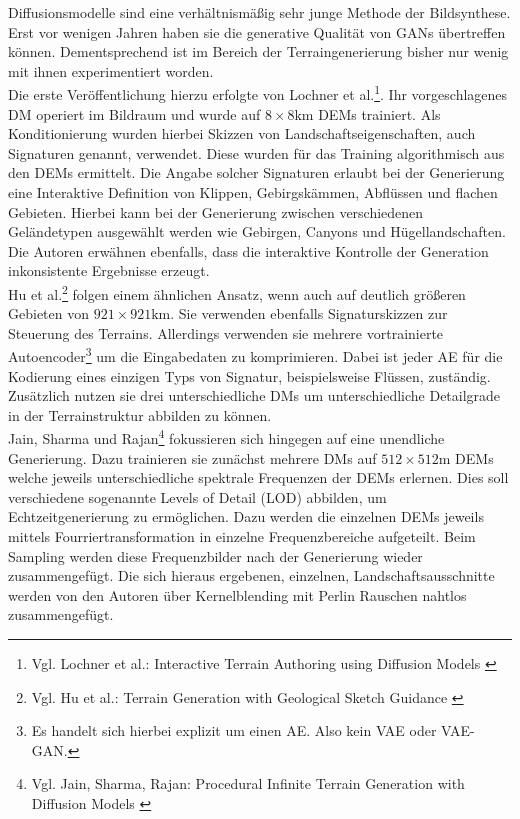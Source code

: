 Diffusionsmodelle sind eine verhältnismäßig sehr junge Methode der Bildsynthese. Erst vor wenigen Jahren haben sie die generative Qualität von \ac{GAN}s übertreffen können. Dementsprechend ist im Bereich der Terraingenerierung bisher nur wenig mit ihnen experimentiert worden. \\
Die erste Veröffentlichung hierzu erfolgte von Lochner et al.\footnote{
    Vgl. Lochner et al.: Interactive Terrain Authoring using Diffusion Models
    \cite{lochner2023interactive}
}. Ihr vorgeschlagenes \ac{DM} operiert im Bildraum und wurde auf $8\times8\text{km}$ \ac{DEM}s trainiert. Als Konditionierung wurden hierbei Skizzen von Landschaftseigenschaften, auch Signaturen genannt, verwendet. Diese wurden für das Training algorithmisch aus den \ac{DEM}s ermittelt. Die Angabe solcher Signaturen erlaubt bei der Generierung eine Interaktive Definition von Klippen, Gebirgskämmen, Abflüssen und flachen Gebieten. Hierbei kann bei der Generierung zwischen verschiedenen Geländetypen ausgewählt werden wie Gebirgen, Canyons und Hügellandschaften. Die Autoren erwähnen ebenfalls, dass die interaktive Kontrolle der Generation inkonsistente Ergebnisse erzeugt.\\
Hu et al.\footnote{
    Vgl. Hu et al.: Terrain Generation with Geological Sketch Guidance
    \cite{hu2024terrain}
} folgen einem ähnlichen Ansatz, wenn auch auf deutlich größeren Gebieten von $921\times921\text{km}$. Sie verwenden ebenfalls Signaturskizzen zur Steuerung des Terrains. Allerdings verwenden sie mehrere vortrainierte Autoencoder\footnote{
    Es handelt sich hierbei explizit um einen \ac{AE}. Also kein \ac{VAE} oder VAE-GAN.
} um die Eingabedaten zu komprimieren. Dabei ist jeder \ac{AE} für die Kodierung eines einzigen Typs von Signatur, beispielsweise Flüssen, zuständig. Zusätzlich nutzen sie drei unterschiedliche \ac{DM}s um unterschiedliche Detailgrade in der Terrainstruktur abbilden zu können. \\
Jain, Sharma und Rajan\footnote{
    Vgl. Jain, Sharma, Rajan: Procedural Infinite Terrain Generation with Diffusion Models
    \cite{jain2022adaptive}
} fokussieren sich hingegen auf eine unendliche Generierung. Dazu trainieren sie zunächst mehrere \ac{DM}s auf $512\times512\text{m}$ \ac{DEM}s welche jeweils unterschiedliche spektrale Frequenzen der \ac{DEM}s erlernen. Dies soll verschiedene sogenannte Levels of Detail (LOD) abbilden, um Echtzeitgenerierung zu ermöglichen. Dazu werden die einzelnen \ac{DEM}s jeweils mittels Fourriertransformation in einzelne Frequenzbereiche aufgeteilt. Beim Sampling werden diese Frequenzbilder nach der Generierung wieder zusammengefügt. Die sich hieraus ergebenen, einzelnen, Landschaftsausschnitte werden von den Autoren über Kernelblending mit Perlin Rauschen nahtlos zusammengefügt. 


